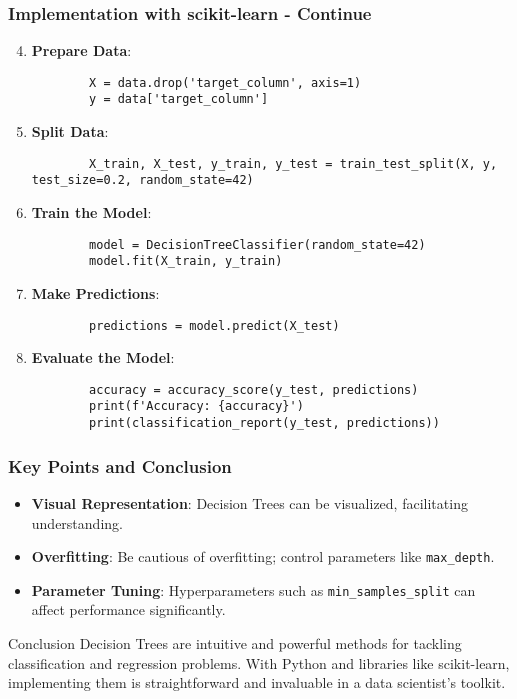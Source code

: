 \documentclass[aspectratio=169]{beamer}
\begin{document}
\begin{frame}[fragile]
    \frametitle{Implementation with scikit-learn - Continue}
    \begin{enumerate}
        \setcounter{enumi}{3} %
        \item \textbf{Prepare Data}:
        \begin{lstlisting}
        X = data.drop('target_column', axis=1)
        y = data['target_column']
        \end{lstlisting}

        \item \textbf{Split Data}:
        \begin{lstlisting}
        X_train, X_test, y_train, y_test = train_test_split(X, y, test_size=0.2, random_state=42)
        \end{lstlisting}

        \item \textbf{Train the Model}:
        \begin{lstlisting}
        model = DecisionTreeClassifier(random_state=42)
        model.fit(X_train, y_train)
        \end{lstlisting}

        \item \textbf{Make Predictions}:
        \begin{lstlisting}
        predictions = model.predict(X_test)
        \end{lstlisting}

        \item \textbf{Evaluate the Model}:
        \begin{lstlisting}
        accuracy = accuracy_score(y_test, predictions)
        print(f'Accuracy: {accuracy}')
        print(classification_report(y_test, predictions))
        \end{lstlisting}
    \end{enumerate}
\end{frame}

\begin{frame}[fragile]
    \frametitle{Key Points and Conclusion}
    \begin{itemize}
        \item \textbf{Visual Representation}: Decision Trees can be visualized, facilitating understanding.
        \item \textbf{Overfitting}: Be cautious of overfitting; control parameters like \texttt{max\_depth}.
        \item \textbf{Parameter Tuning}: Hyperparameters such as \texttt{min\_samples\_split} can affect performance significantly.
    \end{itemize}
    \begin{block}{Conclusion}
        Decision Trees are intuitive and powerful methods for tackling classification and regression problems. With Python and libraries like scikit-learn, implementing them is straightforward and invaluable in a data scientist's toolkit.
    \end{block}
\end{frame}
\end{document}

